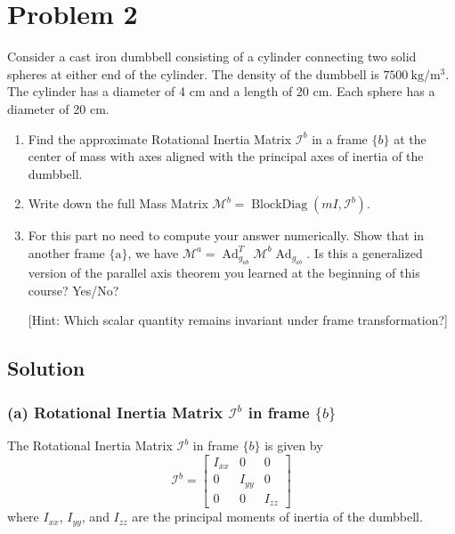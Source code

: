 \section*{Problem 2}
\setcounter{section}{2}
\setcounter{equation}{0}

Consider a cast iron dumbbell consisting of a cylinder connecting two solid spheres at either end of the cylinder.
The density of the dumbbell is \( 7500 \mathrm{~kg} / \mathrm{m}^{3} \).
The cylinder has a diameter of 4 cm and a length of 20 cm.
Each sphere has a diameter of 20 cm.
\begin{enumerate}[label= (\alph*)]
    \item Find the approximate Rotational Inertia Matrix \( \mathcal{I}^{b} \) in a frame \( \{b\} \) at the center of mass with axes aligned with the principal axes of inertia of the dumbbell.

    \item Write down the full Mass Matrix \( \mathcal{M}^{b}=\operatorname{BlockDiag}\left(m I, \mathcal{I}^{b}\right) \).

    \item For this part no need to compute your answer numerically.
          Show that in another frame \( \{\mathrm{a}\} \), we have \( \mathcal{M}^{a}=\operatorname{Ad}_{g_{a b}}^{T} \mathcal{M}^{b} \operatorname{Ad}_{g_{a b}} \).
          Is this a generalized version of the parallel axis theorem you learned at the beginning of this course? Yes/No?

          [Hint: Which scalar quantity remains invariant under frame transformation?]
\end{enumerate}

\subsection*{Solution}

\subsubsection*{(a) Rotational Inertia Matrix \( \mathcal{I}^{b} \) in frame \( \{b\} \)}

The Rotational Inertia Matrix \( \mathcal{I}^{b} \) in frame \( \{b\} \) is given by
\begin{equation}
    \mathcal{I}^{b}=\begin{bmatrix}
        I_{xx} & 0      & 0      \\
        0      & I_{yy} & 0      \\
        0      & 0      & I_{zz}
    \end{bmatrix}
\end{equation}
where \( I_{xx} \), \( I_{yy} \), and \( I_{zz} \) are the principal moments of inertia of the dumbbell.

